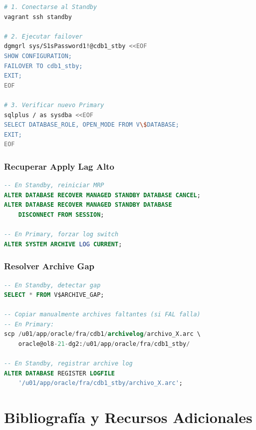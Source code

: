 \documentclass[11pt, a4paper]{report}
\begin{document}
\begin{lstlisting}[language=bash, caption={Failover de Emergencia}]
# 1. Conectarse al Standby
vagrant ssh standby

# 2. Ejecutar failover
dgmgrl sys/S1sPassword1!@cdb1_stby <<EOF
SHOW CONFIGURATION;
FAILOVER TO cdb1_stby;
EXIT;
EOF

# 3. Verificar nuevo Primary
sqlplus / as sysdba <<EOF
SELECT DATABASE_ROLE, OPEN_MODE FROM V\$DATABASE;
EXIT;
EOF
\end{lstlisting}

\subsection{Recuperar Apply Lag Alto}

\begin{lstlisting}[language=SQL, caption={Resolver Retraso en Standby}]
-- En Standby, reiniciar MRP
ALTER DATABASE RECOVER MANAGED STANDBY DATABASE CANCEL;
ALTER DATABASE RECOVER MANAGED STANDBY DATABASE
    DISCONNECT FROM SESSION;

-- En Primary, forzar log switch
ALTER SYSTEM ARCHIVE LOG CURRENT;
\end{lstlisting}

\subsection{Resolver Archive Gap}

\begin{lstlisting}[language=SQL, caption={Recuperación de Logs Faltantes}]
-- En Standby, detectar gap
SELECT * FROM V$ARCHIVE_GAP;

-- Copiar manualmente archives faltantes (si FAL falla)
-- En Primary:
scp /u01/app/oracle/fra/cdb1/archivelog/archivo_X.arc \
    oracle@ol8-21-dg2:/u01/app/oracle/fra/cdb1_stby/

-- En Standby, registrar archive log
ALTER DATABASE REGISTER LOGFILE
    '/u01/app/oracle/fra/cdb1_stby/archivo_X.arc';
\end{lstlisting}

\newpage


\chapter*{Bibliografía y Recursos Adicionales}
\markboth{Bibliografía}{Bibliografía}
\end{document}
